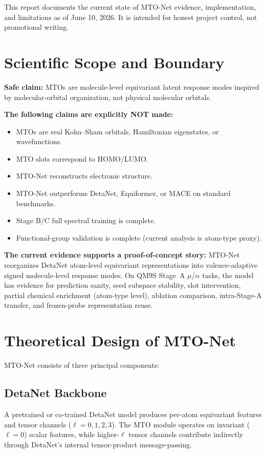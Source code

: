 \documentclass[11pt,a4paper]{article}
\begin{document}
This report documents the current state of MTO-Net evidence, implementation, and limitations as of June 10, 2026. It is intended for honest project control, not promotional writing.

\section{Scientific Scope and Boundary}

\textbf{Safe claim:} MTOs are molecule-level equivariant latent response modes inspired by molecular-orbital organization, not physical molecular orbitals.

\textbf{The following claims are explicitly NOT made:}
\begin{itemize}[nosep]
    \item MTOs are real Kohn--Sham orbitals, Hamiltonian eigenstates, or wavefunctions.
    \item MTO slots correspond to HOMO/LUMO.
    \item MTO-Net reconstructs electronic structure.
    \item MTO-Net outperforms DetaNet, Equiformer, or MACE on standard benchmarks.
    \item Stage B/C full spectral training is complete.
    \item Functional-group validation is complete (current analysis is atom-type proxy).
\end{itemize}

\textbf{The current evidence supports a proof-of-concept story:} MTO-Net reorganizes DetaNet atom-level equivariant representations into valence-adaptive signed molecule-level response modes. On QM9S Stage~A $\mu$/$\alpha$ tasks, the model has evidence for prediction sanity, seed subspace stability, slot intervention, partial chemical enrichment (atom-type level), ablation comparison, intra-Stage-A transfer, and frozen-probe representation reuse.

\section{Theoretical Design of MTO-Net}

MTO-Net consists of three principal components:

\subsection{DetaNet Backbone}
A pretrained or co-trained DetaNet model produces per-atom equivariant features and tensor channels ($\ell = 0,1,2,3$). The MTO module operates on invariant ($\ell=0$) scalar features, while higher-$\ell$ tensor channels contribute indirectly through DetaNet's internal tensor-product message-passing.
\end{document}
